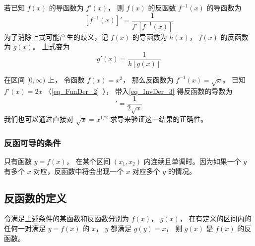 

若已知 $f(x)$ 的导函数为 $f'(x)$， 则 $f(x)$ 的反函数 $f^{-1}(x)$ 的导函数为
\begin{equation}\label{eq_InvDer_3}
[f^{-1}(x)]' = \frac{1}{f'[f^{-1}(x)]} 
\end{equation} 
为了消除上式可能产生的歧义，记 $f(x)$ 的导函数为 $h(x)$，  $f(x)$ 的反函数为 $g(x)$。 上式变为
 \begin{equation}
g'(x) = \frac{1}{h[g(x)]}
\end{equation}

\begin{example}{}
在区间 $[0, \infty)$ 上， 令函数 $f(x) = x^2$， 那么反函数为 $f^{-1}(x) = \sqrt{x}$。 已知 $f'(x) = 2x$ （\autoref{eq_FunDer_2}~）， 带入\autoref{eq_InvDer_3} 得反函数的导数为
\begin{equation}
[f^{-1}(x)]' = \frac{1}{2\sqrt{x}} 
\end{equation}
我们也可以通过直接对 $\sqrt{x} = x^{1/2}$ 求导来验证这一结果的正确性。
\end{example}

\subsubsection{反函可导的条件}
只有函数 $y = f(x)$， 在某个区间 $(x_1, x_2)$ 内连续且单调时。因为如果一个 $y$ 有多个 $x$ 对应，反函数中将会出现一个 $x$ 对应多个 $y$ 的情况。

\subsection{反函数的定义}
令满足上述条件的某函数和反函数分别为 $f(x)$，  $g(x)$， 在有定义的区间内的任何一对满足 $y = f(x)$ 的 $x$，  $y$ 都满足 $g(y) = x$， 则 $g(x)$ 是 $f(x)$ 的反函数。

